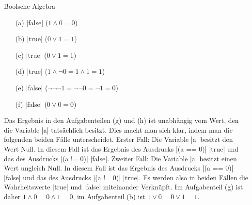 \begin{exercise}{Boolsche Algebra}
\begin{solution}
\begin{center}
\begin{minipage}{0.49\textwidth}
\begin{itemize}
\item[(a)] \code|false| ($1 \wedge 0 = 0$)
\item[(b)] \code|true|   ($0 \vee 1 = 1$)
\item[(c)] \code|true|   ($0 \vee 1 = 1$)
\end{itemize}
\end{minipage}
\begin{minipage}{0.49\textwidth}
\begin{itemize}
\item[(d)] \code|true|   ($1 \wedge \neg 0 = 1 \wedge 1 = 1$)
\item[(e)] \code|false| ($\neg \neg \neg 1 = \neg \neg 0 = \neg 1 = 0$)
\item[(f)] \code|false| ($0 \vee 0 = 0$)
\end{itemize}
\end{minipage}
\end{center}
Das Ergebnis in den Aufgabenteilen (g) und (h) ist unabhängig vom Wert, den die Variable \code|a| tatsächlich besitzt. Dies macht man sich klar, indem man die folgenden beiden Fälle unterscheidet. Erster Fall: Die Variable \code|a| besitzt den Wert Null. In diesem Fall ist das Ergebnis des Ausdrucks \code|(a == 0)| \code|true| und das des Ausdrucks \code|(a != 0)| \code|false|. Zweiter Fall: Die Variable \code|a| besitzt einen Wert ungleich Null. In diesem Fall ist das Ergebnis des Ausdrucks \code|(a == 0)| \code|false| und das des Ausdrucks \code|(a != 0)| \code|true|. Es werden also in beiden Fällen die Wahrheitswerte \code|true| und \code|false| miteinander Verknüpft. Im Aufgabenteil (g) ist daher $1 \wedge 0 = 0 \wedge 1 = 0$, im Aufgabenteil (b) ist $1 \vee 0 = 0 \vee 1 = 1$.
\end{solution}

\end{exercise}
